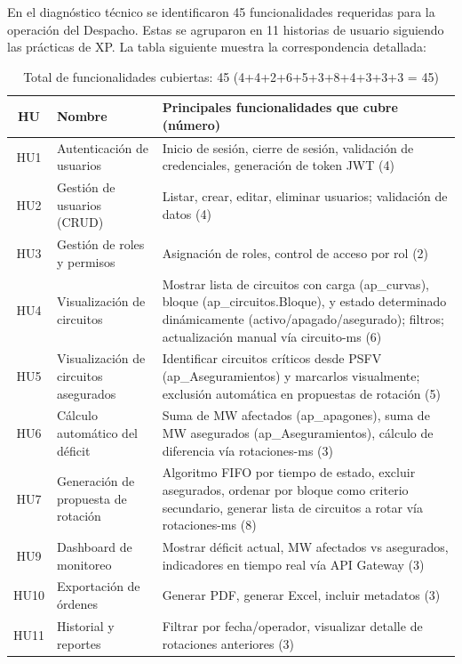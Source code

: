 En el diagnóstico técnico se identificaron 45 funcionalidades requeridas para la operación del Despacho. Estas se agruparon en 11 historias de usuario siguiendo las prácticas de XP. La tabla siguiente muestra la correspondencia detallada:

\begin{table}[H]
\centering
\caption{Correspondencia funcionalidades – historias de usuario}
\label{tab:funcionalidades_hu}
\footnotesize
\begin{tabular}{|c|l|l|}
\hline
\textbf{HU} & \textbf{Nombre} & \textbf{Principales funcionalidades que cubre (número)} \\
\hline
HU1 & Autenticación de usuarios & Inicio de sesión, cierre de sesión, validación de credenciales, generación de token JWT (4) \\
\hline
HU2 & Gestión de usuarios (CRUD) & Listar, crear, editar, eliminar usuarios; validación de datos (4) \\
\hline
HU3 & Gestión de roles y permisos & Asignación de roles, control de acceso por rol (2) \\
\hline
HU4 & Visualización de circuitos & Mostrar lista de circuitos con carga (ap\_curvas), bloque (ap\_circuitos.Bloque), y estado determinado dinámicamente (activo/apagado/asegurado); filtros; actualización manual vía circuito-ms (6) \\
\hline
HU5 & Visualización de circuitos asegurados & Identificar circuitos críticos desde PSFV (ap\_Aseguramientos) y marcarlos visualmente; exclusión automática en propuestas de rotación (5) \\
\hline
HU6 & Cálculo automático del déficit & Suma de MW afectados (ap\_apagones), suma de MW asegurados (ap\_Aseguramientos), cálculo de diferencia vía rotaciones-ms (3) \\
\hline
HU7 & Generación de propuesta de rotación & Algoritmo FIFO por tiempo de estado, excluir asegurados, ordenar por bloque como criterio secundario, generar lista de circuitos a rotar vía rotaciones-ms (8) \\
\hline
HU9 & Dashboard de monitoreo & Mostrar déficit actual, MW afectados vs asegurados, indicadores en tiempo real vía API Gateway (3) \\
\hline
HU10 & Exportación de órdenes & Generar PDF, generar Excel, incluir metadatos (3) \\
\hline
HU11 & Historial y reportes & Filtrar por fecha/operador, visualizar detalle de rotaciones anteriores (3) \\
\hline
\end{tabular}
\caption*{Total de funcionalidades cubiertas: 45 (4+4+2+6+5+3+8+4+3+3+3 = 45)}
\end{table}

